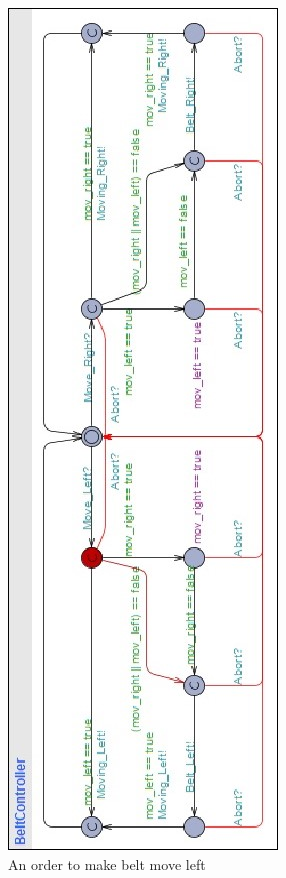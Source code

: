 \documentclass[a4paper,oneside,11pt]{report}
\begin{document}
\begin{figure}
\centering
\includegraphics[height=0.75\textheight]{images/BCTL1.jpg}
\caption{An order to make belt move left}
\label{fig:bctl1}
\end{figure}
\end{document}
